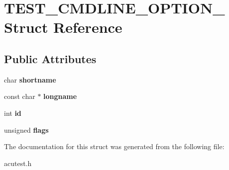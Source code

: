 \hypertarget{structTEST__CMDLINE__OPTION__}{}\section{T\+E\+S\+T\+\_\+\+C\+M\+D\+L\+I\+N\+E\+\_\+\+O\+P\+T\+I\+O\+N\+\_\+ Struct Reference}
\label{structTEST__CMDLINE__OPTION__}
\subsection*{Public Attributes}
\begin{DoxyCompactItemize}
\item 
char {\bfseries shortname}\hypertarget{structTEST__CMDLINE__OPTION___ab8c01cb18e3ab71fe3375f02c9141d21}{}\label{structTEST__CMDLINE__OPTION___ab8c01cb18e3ab71fe3375f02c9141d21}

\item 
const char $\ast$ {\bfseries longname}\hypertarget{structTEST__CMDLINE__OPTION___a6ac286aa4e779d7006062f94a64b76fd}{}\label{structTEST__CMDLINE__OPTION___a6ac286aa4e779d7006062f94a64b76fd}

\item 
int {\bfseries id}\hypertarget{structTEST__CMDLINE__OPTION___a0b32f6429192c49799d68f0f104d8005}{}\label{structTEST__CMDLINE__OPTION___a0b32f6429192c49799d68f0f104d8005}

\item 
unsigned {\bfseries flags}\hypertarget{structTEST__CMDLINE__OPTION___a668a4b89aa0bfdfc8d15ef9b387dabad}{}\label{structTEST__CMDLINE__OPTION___a668a4b89aa0bfdfc8d15ef9b387dabad}

\end{DoxyCompactItemize}


The documentation for this struct was generated from the following file\+:\begin{DoxyCompactItemize}
\item 
acutest.\+h\end{DoxyCompactItemize}
